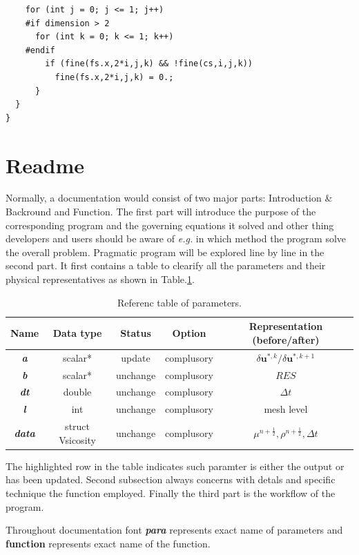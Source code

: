 \documentclass[a4paper]{article}
\newcommand{\func}[1]{\textbf{\textcolor{function}{#1}}}
\newcommand{\para}[1]{\textbf{\emph{\textcolor{para}{#1}}}}
\begin{document}
\begin{multicols}{2}
 \columnbreak
 \begin{verbatim}
	for (int j = 0; j <= 1; j++)
	#if dimension > 2
	  for (int k = 0; k <= 1; k++)
	#endif
	    if (fine(fs.x,2*i,j,k) && !fine(cs,i,j,k))
	      fine(fs.x,2*i,j,k) = 0.;
      }
  }
}
 \end{verbatim}
\end{multicols}

\section{Readme}
Normally, a documentation would consist of two major parts: Introduction \& Backround and Function. The first part will introduce the purpose of the corresponding program and the governing equations it solved and other thing developers and users should be aware of \emph{e.g.} in which method the program solve the overall problem. Pragmatic program will be explored line by line in the second part. It first contains a table to clearify all the parameters and their physical representatives as shown in Table.\ref{tab:test}. 
\begin{table}[h]
  \centering
  \begin{tabular}{|c|c|c|c|c|}
    \hline
    Name & Data type & Status & Option & Representation (before/after)\\[0.5ex]
    \hline\hline
    \rowcolor{output} \para{a} & scalar* & update & complusory & $\delta \mathbf{u}^{*,k}/\delta \mathbf{u}^{*,k+1}$\\
    \hline
    \para{b} & scalar* & unchange & complusory & $RES$\\
    \hline
    \para{dt} & double & unchange & complusory & $\Delta t$\\
    \hline
    \para{l} & int & unchange & complusory &  mesh level \\
    \hline
    \para{data} & struct Vsicosity & unchange & complusory & $\mu^ {n+\frac{1}{2}}, \rho^{n+\frac{1}{2}}, \Delta t$ \\
    \hline
  \end{tabular}
  \caption{Referenc table of parameters.}
  \label{tab:test}
\end{table}
The highlighted row in the table indicates such paramter is either the output or has been updated. Second subsection always concerns with detals and specific technique the function employed. Finally the third part is the workflow of the program.\par
Throughout documentation font \para{para} represents exact name of parameters and \func{function} represents exact name of the function.
\end{document}
